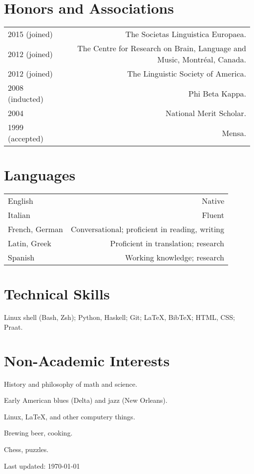 \documentclass[11pt,letterpaper,twoside]{article}
\makeatletter
\newenvironment{cvsection}{%
  \renewcommand{\arraystretch}{1.75}
  \begin{longtable}[l]{@{} L R @{}}
}{%
  \end{longtable}
}
\makeatother
\begin{document}
\section*{Honors and Associations}

\begin{cvsection}
  2015 {\footnotesize (joined)} & The Societas Linguistica Europaea.\\

  2012 {\footnotesize (joined)} & The Centre for Research on Brain, Language
  and Music, Montr\'{e}al, Canada.\\

  2012 {\footnotesize (joined)} & The Linguistic Society of America.\\

  2008 {\footnotesize (inducted)} & Phi Beta Kappa.\\

  2004 & National Merit Scholar.\\

  1999 {\footnotesize (accepted)} & Mensa.\\
\end{cvsection}

\section*{Languages}

\begin{cvsection}
  English & Native\\
  Italian & Fluent\\
  French, German & Conversational; proficient in reading, writing\\
  Latin, Greek & Proficient in translation; research\\
  Spanish & Working knowledge; research\\
\end{cvsection}

\section*{Technical Skills}

Linux shell (Bash, Zsh); Python, Haskell; Git; \LaTeX, Bib\TeX; HTML, CSS;
Praat.

\section*{Non-Academic Interests}

\begin{list}{}{\leftmargin=0pt}
  \item History and philosophy of math and science.
  \item Early American blues (Delta) and jazz (New Orleans).
  \item Linux, \LaTeX{}, and other computery things.
  \item Brewing beer, cooking.
  \item Chess, puzzles.
\end{list}

\null\hfill {\footnotesize Last updated: \today}
\end{document}
